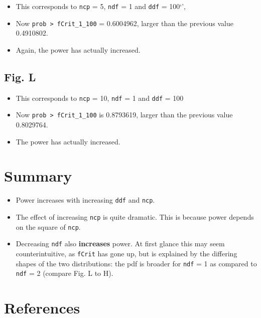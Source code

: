 \documentclass[]{book}
\providecommand{\tightlist}{%
  \setlength{\itemsep}{0pt}\setlength{\parskip}{0pt}}
\begin{document}
\begin{itemize}
\tightlist
\item
  This corresponds to \texttt{ncp} = 5, \texttt{ndf} = 1 and \texttt{ddf} = 100`',
\item
  Now \texttt{prob\ \textgreater{}\ fCrit\_1\_100} = 0.6004962, larger than the previous value 0.4910802.
\item
  Again, the power has actually increased.
\end{itemize}

\hypertarget{fig.-l}{%
\subsection{Fig. L}\label{fig.-l}}

\begin{itemize}
\tightlist
\item
  This corresponds to \texttt{ncp} = 10, \texttt{ndf} = 1 and \texttt{ddf} = 100
\item
  Now \texttt{prob\ \textgreater{}\ fCrit\_1\_100} is 0.8793619, larger than the previous value 0.8029764.
\item
  The power has actually increased.
\end{itemize}

\hypertarget{summary-4}{%
\section{Summary}\label{summary-4}}

\begin{itemize}
\tightlist
\item
  Power increases with increasing \texttt{ddf} and \texttt{ncp}.
\item
  The effect of increasing \texttt{ncp} is quite dramatic. This is because power depends on the square of \texttt{ncp}.
\item
  Decreasing \texttt{ndf} also \textbf{increases} power. At first glance this may seem counterintuitive, as \texttt{fCrit} has gone up, but is explained by the differing shapes of the two distributions: the pdf is broader for \texttt{ndf} = 1 as compared to \texttt{ndf} = 2 (compare Fig. L to H).
\end{itemize}

\hypertarget{references-6}{%
\section{References}\label{references-6}}
\end{document}
